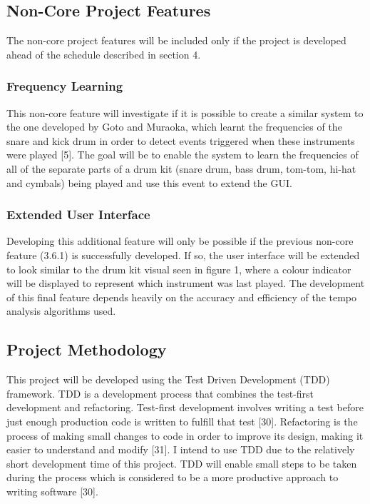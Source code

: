 \documentclass[a4paper, 11pt]{article}
\begin{document}
\subsection{Non-Core Project Features}
The non-core project features will be included only if the project is developed ahead of the schedule described in section 4. 

\subsubsection{Frequency Learning}
This non-core feature will investigate if it is possible to create a similar system to the one developed by Goto and Muraoka, which learnt the frequencies of the snare and kick drum in order to detect events triggered when these instruments were played [5]. The goal will be to enable the system to learn the frequencies of all of the separate parts of a drum kit (snare drum, bass drum, tom-tom, hi-hat and cymbals) being played and use this event to extend the GUI.

\subsubsection{Extended User Interface}
Developing this additional feature will only be possible if the previous non-core feature (3.6.1) is successfully developed. If so, the user interface will be extended to look similar to the drum kit visual seen in figure 1, where a colour indicator will be displayed to represent which instrument was last played. The development of this final feature depends heavily on the accuracy and efficiency of the tempo analysis algorithms used.

\subsection{Project Methodology}
This project will be developed using the Test Driven Development (TDD) framework. TDD is a development process that combines the test-first development and refactoring. Test-first development involves writing a test before just enough production code is written to fulfill that test [30]. Refactoring is the process of making small changes to code in order to improve its design, making it easier to understand and modify [31]. I intend to use TDD due to the relatively short development time of this project. TDD will enable small steps to be taken during the process which is considered to be a more productive approach to writing software [30].
\end{document}

